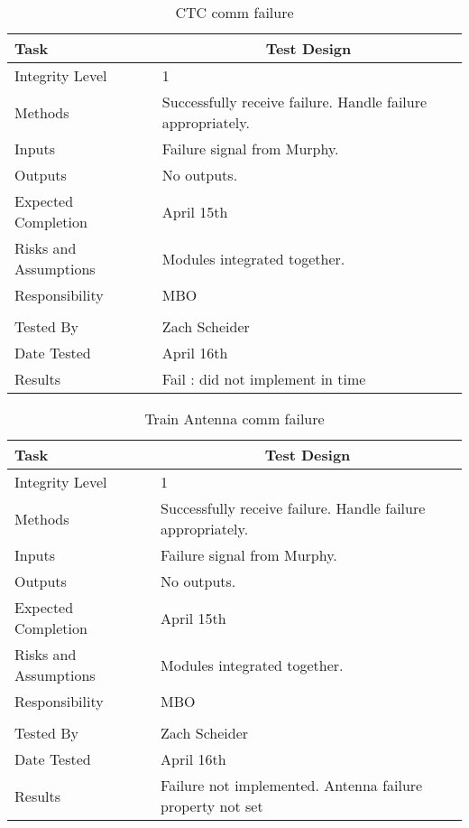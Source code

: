 \documentclass[]{article}
\begin{document}
\begin{table}[H]
	\centering
	\caption{CTC comm failure}
	\begin{tabular}{|l|l|}
		\hline
		Task & \multicolumn{1}{c|}{Test Design} \\ \hline
		Integrity Level & 1 \\ \hline
		Methods & \parbox[t]{10cm}{Successfully receive failure. Handle failure appropriately. }\\ \hline
		Inputs &  \parbox[t]{10cm}{Failure signal from Murphy. } \\ \hline
		Outputs &  \parbox[t]{10cm}{No outputs. } \\ \hline
		Expected Completion & April 15th \\ \hline
		Risks and Assumptions & \parbox[t]{10cm}{Modules integrated together.}  \\ \hline		
		Responsibility & MBO\\ \hline
			\\ \hline
		Tested By   &  Zach Scheider\\	\hline
		Date Tested & \parbox[t]{10cm}{April 16th}\\ \hline
		Results & Fail : did not implement in time\\ \hline
	\end{tabular}
\end{table}

\begin{table}[H]
	\centering
	\caption{Train Antenna comm failure}
	\begin{tabular}{|l|l|}
		\hline
		Task & \multicolumn{1}{c|}{Test Design} \\ \hline
		Integrity Level & 1 \\ \hline
		Methods & \parbox[t]{10cm}{Successfully receive failure. Handle failure appropriately. }\\ \hline
		Inputs &  \parbox[t]{10cm}{Failure signal from Murphy. } \\ \hline
		Outputs &  \parbox[t]{10cm}{No outputs. } \\ \hline
		Expected Completion & April 15th \\ \hline
		Risks and Assumptions & \parbox[t]{10cm}{Modules integrated together.}  \\ \hline
		Responsibility & MBO\\ \hline
			\\ \hline
		Tested By   &  Zach Scheider\\	\hline
		Date Tested & \parbox[t]{10cm}{April 16th}\\ \hline
		Results & Failure not implemented. Antenna failure property not set\\ \hline
	\end{tabular}
\end{table}
\end{document}
